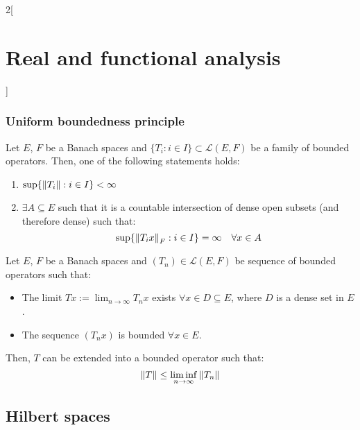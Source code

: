 \documentclass[../../../main_math.tex]{subfiles}
\begin{document}
\begin{multicols}{2}[\section{Real and functional analysis}]
  \subsubsection{Uniform boundedness principle}
  \begin{theorem}
    Let $E$, $F$ be a Banach spaces and $\{T_i:i\in I\}\subset\mathcal{L}(E, F)$ be a family of bounded operators. Then, one of the following statements holds:
    \begin{enumerate}
      \item $\sup\{\left\|T_i\right\|:i\in I\}<\infty$
      \item $\exists A\subseteq E$ such that it is a countable intersection of dense open subsets (and therefore dense) such that: $$\sup\{\left\|T_ix\right\|_F:i\in I\}=\infty\quad\forall x\in A$$
    \end{enumerate}
  \end{theorem}
  \begin{corollary}
    Let $E$, $F$ be a Banach spaces and $(T_n)\in\mathcal{L}(E,F)$ be sequence of bounded operators such that:
    \begin{itemize}
      \item The limit $Tx:=\displaystyle\lim_{n\to\infty}T_nx$ exists $\forall x\in D\subseteq E$, where $D$ is a dense set in $E$.
      \item The sequence $(T_nx)$ is bounded $\forall x\in E$.
    \end{itemize}
    Then, $T$ can be extended into a bounded operator such that: $$\left\|T\right\|\leq \liminf_{n\to\infty}\left\|T_n\right\|$$
  \end{corollary}
  \subsection{Hilbert spaces}

\end{multicols}
\end{document}

